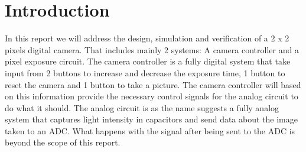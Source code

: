 \section{Introduction}

In this report we will address the design, simulation and verification of a 2 x 2 pixels digital camera. That includes mainly 2 systems: A camera controller and a pixel exposure circuit. The camera controller is a fully digital system that take input from 2 buttons to increase and decrease the exposure time, 1 button to reset the camera and 1 button to take a picture. The camera controller will based on this information provide the necessary control signals for the analog circuit to do what it should. The analog circuit is as the name suggests a fully analog system that captures light intensity in capacitors and send data about the image taken to an ADC. What happens with the signal after being sent to the ADC is beyond the scope of this report.
